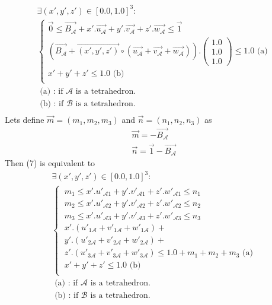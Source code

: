 \documentclass[12pt, a4paper]{article}
\begin{document}
\begin{equation}
\begin{array}{l}
\exists(x', y', z')\in[0.0, 1.0]^3:\\
\left\{
\begin{array}{l}
\overrightarrow{0}\le\overrightarrow{B_\mathcal{A}}+x'.\overrightarrow{u_\mathcal{A}}+y'.\overrightarrow{v_\mathcal{A}}+z'.\overrightarrow{w_\mathcal{A}}\le\overrightarrow{1}\\
\left(\overrightarrow{B_\mathcal{A}}+\overrightarrow{(x',y',z')}\circ(\overrightarrow{u_\mathcal{A}}+\overrightarrow{v_\mathcal{A}}+\overrightarrow{w_\mathcal{A}})\right).\left(\begin{array}{c}1.0\\1.0\\1.0\end{array}\right)\le 1.0 \mbox{ (a)}\\
x'+y'+z'\le 1.0 \mbox{ (b)}\\
\end{array}
\right.\\
\mbox{ (a) : if $\mathcal{A}$ is a tetrahedron.}\\
\mbox{ (b) : if $\mathcal{B}$ is a tetrahedron.}\\
\end{array}
\end{equation}
Lets define $\overrightarrow{m}=(m_1, m_2, m_3)$ and $\overrightarrow{n}=(n_1, n_2, n_3)$ as 
\begin{equation}
\begin{array}{c}
\overrightarrow{m}=-\overrightarrow{B_\mathcal{A}}\\
\overrightarrow{n}=\overrightarrow{1}-\overrightarrow{B_\mathcal{A}}
\end{array}
\end{equation}
Then (7) is equivalent to
\begin{equation}
\begin{array}{l}
\exists(x', y', z')\in[0.0, 1.0]^3:\\
\left\{\
\begin{array}{l}
m_1 \le x'.u'_{\mathcal{A}1}+y'.v'_{\mathcal{A}1}+z'.w'_{\mathcal{A}1} \le n_1\\
m_2 \le x'.u'_{\mathcal{A}2}+y'.v'_{\mathcal{A}2}+z'.w'_{\mathcal{A}2} \le n_2\\
m_3 \le x'.u'_{\mathcal{A}3}+y'.v'_{\mathcal{A}3}+z'.w'_{\mathcal{A}3} \le n_3\\
x'.\left(u'_{1\mathcal{A}}+v'_{1\mathcal{A}}+w'_{1\mathcal{A}}\right)+\\
y'.\left(u'_{2\mathcal{A}}+v'_{2\mathcal{A}}+w'_{2\mathcal{A}}\right)+\\
z'.\left(u'_{3\mathcal{A}}+v'_{3\mathcal{A}}+w'_{3\mathcal{A}}\right)\le1.0+m_1+m_2+m_3 \mbox{ (a)}\\
x'+y'+z'\le 1.0 \mbox{ (b)}\\
\end{array}
\right.\\
\mbox{ (a) : if $\mathcal{A}$ is a tetrahedron.}\\
\mbox{ (b) : if $\mathcal{B}$ is a tetrahedron.}\\
\end{array}
\end{equation}
\end{document}

